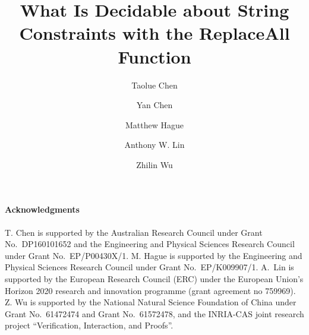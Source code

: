 \documentclass[a4paper]{easychair}
\newcommand\shortlong[2]{#2}
\begin{document}
\title{What Is Decidable about String Constraints with the ReplaceAll Function}

\author{
    Taolue Chen
    \and
    Yan Chen
    \and
    Matthew Hague
    \and
    Anthony W. Lin
    \and
    Zhilin Wu
}



\maketitle






















\paragraph{Acknowledgments}
%
T. Chen is supported by the Australian Research Council under Grant
No.~DP160101652 and the Engineering and Physical Sciences Research Council
under Grant No.~EP/P00430X/1.
%
M. Hague is supported by the Engineering and Physical Sciences Research Council
under Grant No.~EP/K009907/1.
%
A.~Lin is supported by the European Research Council (ERC) under the European
Union's Horizon 2020 research and innovation programme (grant agreement no
759969).
%
Z. Wu is supported by the National Natural Science Foundation of China under
Grant No.~61472474 and Grant No.~61572478, and the INRIA-CAS joint research
project ``Verification, Interaction, and Proofs''.


\newpage



\shortlong{}{

\newpage


}
\end{document}
